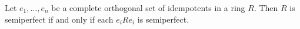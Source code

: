 Let $e_1, \ldots, e_n$ be a complete orthogonal set of idempotents in a ring $R$. Then $R$ is semiperfect if and only if each $e_i R e_i$ is semiperfect.
